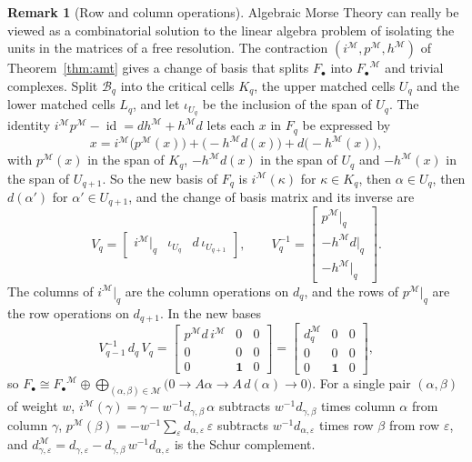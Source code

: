 \documentclass[12pt]{amsart}
\theoremstyle{plain}
\theoremstyle{definition}
\newtheorem{remark}[theorem]{Remark}
\newcommand{\F}{ {F_\bullet} }
\newcommand{\M}{\mathcal{M}}
\newcommand{\B}{\mathcal{B}}
\newcommand{\id}{\operatorname{id}}
\begin{document}
\begin{remark}[Row and column operations]\label{rem:rowcol}
    Algebraic Morse Theory can really be viewed as a combinatorial solution to the linear algebra problem of isolating the units in the matrices of a free resolution. The contraction $(i^{\M}, p^{\M}, h^{\M})$ of Theorem~\ref{thm:amt} gives a change of basis that splits $\F$ into $\F^{\M}$ and trivial complexes. Split $\B_q$ into the critical cells $K_q$, the upper matched cells $U_q$ and the lower matched cells $L_q$, and let $\iota_{U_q}$ be the inclusion of the span of $U_q$. The identity $i^{\M} p^{\M} - \id = d h^{\M} + h^{\M} d$ lets each $x$ in $F_q$ be expressed by
    \[
        x = i^{\M}\bigl(p^{\M}(x)\bigr) + \bigl(-h^{\M} d(x)\bigr) + d\bigl(-h^{\M}(x)\bigr),
    \]
    with $p^{\M}(x)$ in the span of $K_q$, $-h^{\M} d(x)$ in the span of $U_q$ and $-h^{\M}(x)$ in the span of $U_{q+1}$. So the new basis of $F_q$ is $i^{\M}(\kappa)$ for $\kappa \in K_q$, then $\alpha \in U_q$, then $d(\alpha')$ for $\alpha' \in U_{q+1}$, and the change of basis matrix and its inverse are
    \[
        V_q = \begin{bmatrix} i^{\M}|_q & \iota_{U_q} & d\, \iota_{U_{q+1}} \end{bmatrix}, \qquad
        V_q^{-1} = \begin{bmatrix} p^{\M}|_q\\ -h^{\M} d|_q\\ -h^{\M}|_q \end{bmatrix}.
    \]
    The columns of $i^{\M}|_q$ are the column operations on $d_q$, and the rows of $p^{\M}|_q$ are the row operations on $d_{q+1}$. In the new bases
    \[
        V_{q-1}^{-1}\, d_q\, V_q = \begin{bmatrix} p^{\M} d\, i^{\M} & 0 & 0\\ 0 & 0 & 0\\ 0 & \mathbf{1} & 0 \end{bmatrix} = \begin{bmatrix} d^{\M}_q & 0 & 0\\ 0 & 0 & 0\\ 0 & \mathbf{1} & 0 \end{bmatrix},
    \]
    so $\F \cong \F^{\M} \oplus \bigoplus_{(\alpha, \beta) \in \M} \bigl(0 \to A\alpha \to A\, d(\alpha) \to 0\bigr)$. For a single pair $(\alpha, \beta)$ of weight $w$, $i^{\M}(\gamma) = \gamma - w^{-1} d_{\gamma,\beta}\, \alpha$ subtracts $w^{-1} d_{\gamma,\beta}$ times column $\alpha$ from column $\gamma$, $p^{\M}(\beta) = -w^{-1} \sum_{\varepsilon} d_{\alpha,\varepsilon}\, \varepsilon$ subtracts $w^{-1} d_{\alpha,\varepsilon}$ times row $\beta$ from row $\varepsilon$, and $d^{\M}_{\gamma,\varepsilon} = d_{\gamma,\varepsilon} - d_{\gamma,\beta}\, w^{-1} d_{\alpha,\varepsilon}$ is the Schur complement.
\end{remark}
\end{document}
